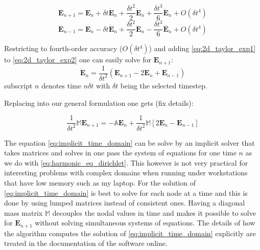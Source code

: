 \begin{equation}
\mathbf{E}_{n+1} = \mathbf{E}_n + \delta t \dot{\mathbf{E}}_n +\frac{\delta t^2}{2} \ddot{\mathbf{E}}_n +\frac{\delta t^3}{6} \dddot{\mathbf{E}}_n+ O(\delta t^4)
\label{eq:2d_taylor_exp1}
\end{equation}
\begin{equation}
\mathbf{E}_{n-1} = \mathbf{E}_n - \delta t \dot{\mathbf{E}}_n +\frac{\delta t^2}{2} \ddot{\mathbf{E}}_n-\frac{\delta t^3}{6} \dddot{\mathbf{E}}_n+ O(\delta t^4)
\label{eq:2d_taylor_exp2}
\end{equation}

Restricting to fourth-order accuracy ($O(\delta t^4)$) and  adding \ref{eq:2d_taylor_exp1} to \ref{eq:2d_taylor_exp2} one can easily solve for $\mathbf{E}_{n+1}$:
\begin{equation}
\ddot{\mathbf{E}}_n = \frac{1}{\delta t^2}\left(\mathbf{E}_{n+1}-2 \mathbf{E}_{n} + \mathbf{E}_{n-1}\right)
\label{eq:central-difference}
\end{equation}
subscript $n$ denotes time $n\delta t$ with $\delta t$ being the selected timestep.

Replacing into our general formulation one gets (fix details):

\begin{equation}
\frac{1}{\delta t^2} \mathbb{M} \mathbf{E}_{n+1} = - \mathbb{A}\mathbf{E}_n + \frac{1}{\delta t^2}\mathbb{M}\left[2
\mathbf{E}_{n}-\mathbf{E}_{n-1}
\right] 	 
\label{eq:implicit_time_domain}
\end{equation}

The equation \ref{eq:implicit_time_domain} can be solve by an implicit solver that takes matrices and solves in one pass the system of equations for one time $n$ as we do with \ref{eq:harmonic_eq_dirichlet}. This however is not very practical for interesting problems with complex domains when running under workstations that have low memory such as my laptop. For the solution of \ref{eq:implicit_time_domain} is best to solve for each node at a time and this is done by using lumped matrices instead of consistent ones. Having a diagonal mass matrix $\mathbb{M}$ decouples the nodal values in time and makes it possible to solve for $\mathbf{E}_{n+1}$ without solving simultaneous systems of equations. The details of how the algorithm computes the solution of \ref{eq:implicit_time_domain} explicitly are treated in the documentation of the software online.
